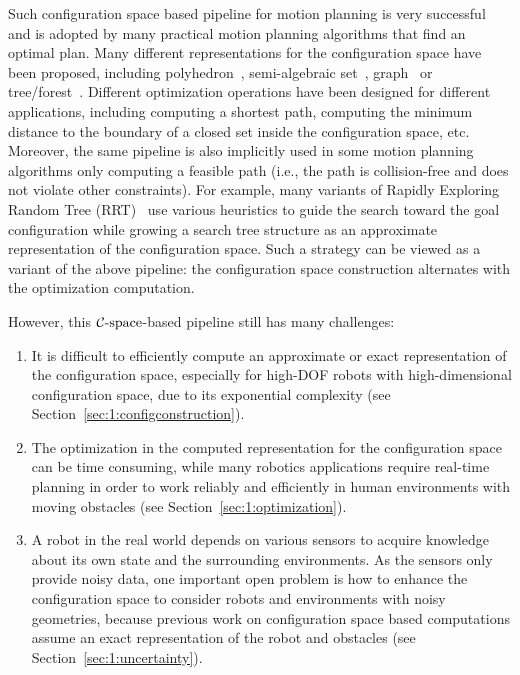 Such configuration space based pipeline for motion planning is very successful and is adopted by many practical motion planning algorithms that find an optimal plan. Many different representations for the configuration space have been proposed, including polyhedron~\cite{Chazelle:ADS:1987}, semi-algebraic set~\cite{Canny:1988:AGC,Canny:1988:CKP}, graph~\cite{Kavraki96} or tree/forest~\cite{Kuffner00}. Different optimization operations have been designed for different applications, including computing a shortest path, computing the minimum distance to the boundary of a closed set inside the configuration space, etc. Moreover, the same pipeline is also implicitly used in some motion planning algorithms only computing a feasible path (i.e., the path is collision-free and does not violate other constraints). For example, many variants of Rapidly Exploring Random Tree (RRT)~\cite{Kuffner00} use various heuristics to guide the search toward the goal configuration while growing a search tree structure as an approximate representation of the configuration space. Such a strategy can be viewed as a variant of the above pipeline: the configuration space construction alternates with the optimization computation.


However, this $\mathcal C\text{-space}$-based pipeline still has many challenges:
\begin{enumerate}
\item It is difficult to efficiently compute an approximate or exact representation of the configuration space, especially for high-DOF robots with high-dimensional configuration space, due to its exponential complexity (see Section~\ref{sec:1:configconstruction}).
\item The optimization in the computed representation for the configuration space can be time consuming, while many robotics applications require real-time planning in order to work reliably and efficiently in human environments with moving obstacles (see Section~\ref{sec:1:optimization}).
\item A robot in the real world depends on various sensors to acquire knowledge about its own state and the surrounding environments. As the sensors only provide noisy data, one important open problem is how to enhance the configuration space to consider robots and environments with noisy geometries, because previous work on configuration space based computations assume an exact representation of the robot and obstacles (see Section~\ref{sec:1:uncertainty}).
\end{enumerate}



